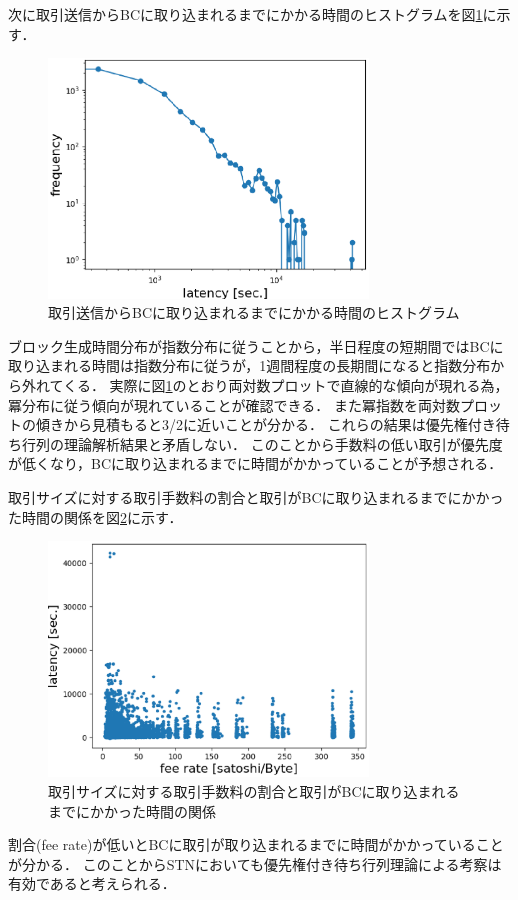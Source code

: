 \documentclass[graybox]{svmult}
\begin{document}
次に取引送信からBCに取り込まれるまでにかかる時間のヒストグラムを図\ref{fig:exp3-2}に示す．
%
\begin{figure}[t]
  \begin{center}
    \includegraphics[width=85mm]{exp3-2.eps}
  \end{center}
  \caption{取引送信からBCに取り込まれるまでにかかる時間のヒストグラム}
  \label{fig:exp3-2}
\end{figure}
%
ブロック生成時間分布が指数分布に従うことから，半日程度の短期間ではBCに取り込まれる時間は指数分布に従うが，1週間程度の長期間になると指数分布から外れてくる．
実際に図\ref{fig:exp3-2}のとおり両対数プロットで直線的な傾向が現れる為，冪分布に従う傾向が現れていることが確認できる．
また冪指数を両対数プロットの傾きから見積もると3/2に近いことが分かる．
これらの結果は優先権付き待ち行列の理論解析結果と矛盾しない．
このことから手数料の低い取引が優先度が低くなり，BCに取り込まれるまでに時間がかかっていることが予想される．

取引サイズに対する取引手数料の割合と取引がBCに取り込まれるまでにかかった時間の関係を図\ref{fig:exp3-3}に示す．
%
\begin{figure}[t]
  \begin{center}
    \includegraphics[width=85mm]{exp3-3.eps}
  \end{center}
  \caption{取引サイズに対する取引手数料の割合と取引がBCに取り込まれるまでにかかった時間の関係}
  \label{fig:exp3-3}
\end{figure}
%
割合(fee rate)が低いとBCに取引が取り込まれるまでに時間がかかっていることが分かる．
このことからSTNにおいても優先権付き待ち行列理論による考察は有効であると考えられる．
\end{document}

